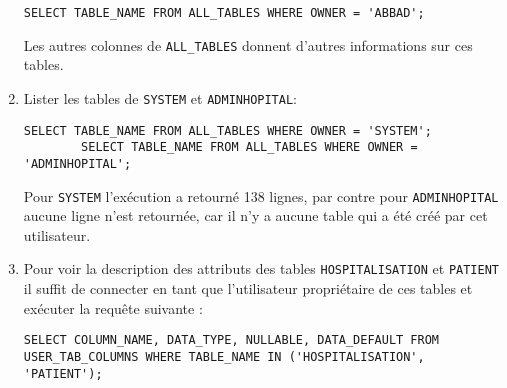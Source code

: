 \documentclass[12pt,a4paper]{article}
\begin{document}
\begin{enumerate}
	\begin{lstlisting}[style=OracleSQL]
		SELECT TABLE_NAME FROM ALL_TABLES WHERE OWNER = 'ABBAD';
	\end{lstlisting}
	Les autres colonnes de \texttt{ALL\_TABLES} donnent d'autres informations sur ces tables.
	\item Lister les tables de \texttt{SYSTEM} et \texttt{ADMINHOPITAL}:
	\begin{lstlisting}[style=OracleSQL]
		SELECT TABLE_NAME FROM ALL_TABLES WHERE OWNER = 'SYSTEM';
		SELECT TABLE_NAME FROM ALL_TABLES WHERE OWNER = 'ADMINHOPITAL';
	\end{lstlisting}
	Pour \texttt{SYSTEM} l'exécution a retourné 138 lignes, par contre pour \texttt{ADMINHOPITAL} aucune ligne n'est retournée, car
	il n'y a aucune table qui a été créé par cet utilisateur.
	\item Pour voir la description des attributs des tables \texttt{HOSPITALISATION} et \texttt{PATIENT} il suffit de connecter en tant
	que l'utilisateur propriétaire de ces tables et exécuter la requête suivante :
	\begin{lstlisting}[style=OracleSQL]
		SELECT COLUMN_NAME, DATA_TYPE, NULLABLE, DATA_DEFAULT FROM USER_TAB_COLUMNS WHERE TABLE_NAME IN ('HOSPITALISATION', 'PATIENT');
	\end{lstlisting}
\end{enumerate}
\end{document}
